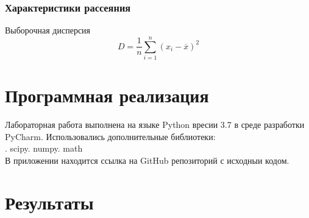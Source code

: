 \documentclass[a4paper]{article}
\begin{document}
	\subsubsection{Характеристики рассеяния}
	Выборочная дисперсия
	\begin{equation}
		D = \frac{1}{n}\sum_{i=1}^{n}{(x_i-\overline{x})^2}
	\end{equation}
	
\section {Программная реализация}
\noindent Лабораторная работа выполнена на языке Python вресии 3.7 в среде разработки PyCharm. Использовались дополнительные библиотеки:\\ . scipy. numpy. math\newline
\\
В приложении находится ссылка на GitHub репозиторий с исходныи кодом.

\section {Результаты} 
\end{document}
